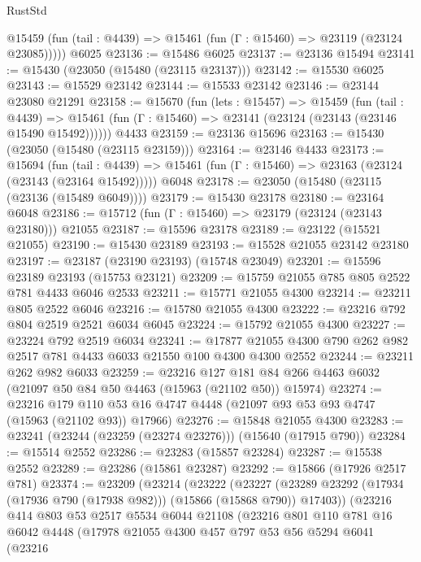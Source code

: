 \begin{lexlean}{RustStd}
\begin{coremodule}
{\begin{coremodule}
{{{{{{{{{{{{{{{{{{{{{{{{{{{{{{{{{{{{{{{{{{{{{{{{{{{{{{{{{{{{      @15459 (fun (tail : @4439) => @15461 (fun (Γ : @15460) => @23119 (@23124 @23085)))))
    @6025
@23136 := @15486 @6025
@23137 := @23136 @15494
@23141 := @15430 (@23050 (@15480 (@23115 @23137)))
@23142 := @15530 @6025
@23143 := @15529 @23142
@23144 := @15533 @23142
@23146 := @23144 @23080 @21291
@23158 := @15670
    (fun (lets : @15457) =>
    @15459
      (fun (tail : @4439) =>
      @15461 (fun (Γ : @15460) => @23141 (@23124 (@23143 (@23146 @15490 @15492))))))
    @4433
@23159 := @23136 @15696
@23163 := @15430 (@23050 (@15480 (@23115 @23159)))
@23164 := @23146 @4433
@23173 := @15694
    (fun (tail : @4439) => @15461 (fun (Γ : @15460) => @23163 (@23124 (@23143 (@23164 @15492)))))
    @6048
@23178 := @23050 (@15480 (@23115 (@23136 (@15489 @6049))))
@23179 := @15430 @23178
@23180 := @23164 @6048
@23186 := @15712 (fun (Γ : @15460) => @23179 (@23124 (@23143 @23180))) @21055
@23187 := @15596 @23178
@23189 := @23122 (@15521 @21055)
@23190 := @15430 @23189
@23193 := @15528 @21055 @23142 @23180
@23197 := @23187 (@23190 @23193) (@15748 @23049)
@23201 := @15596 @23189 @23193 (@15753 @23121)
@23209 := @15759 @21055 @785 @805 @2522 @781 @4433 @6046 @2533
@23211 := @15771 @21055 @4300
@23214 := @23211 @805 @2522 @6046
@23216 := @15780 @21055 @4300
@23222 := @23216 @792 @804 @2519 @2521 @6034 @6045
@23224 := @15792 @21055 @4300
@23227 := @23224 @792 @2519 @6034
@23241 := @17877 @21055 @4300 @790 @262 @982 @2517 @781 @4433 @6033 @21550 @100 @4300 @4300 @2552
@23244 := @23211 @262 @982 @6033
@23259 := @23216
    @127
    @181
    @84
    @266
    @4463
    @6032
    (@21097 @50 @84 @50 @4463 (@15963 (@21102 @50)) @15974)
@23274 := @23216
    @179
    @110
    @53
    @16
    @4747
    @4448
    (@21097 @93 @53 @93 @4747 (@15963 (@21102 @93)) @17966)
@23276 := @15848 @21055 @4300
@23283 := @23241 (@23244 (@23259 (@23274 @23276))) (@15640 (@17915 @790))
@23284 := @15514 @2552
@23286 := @23283 (@15857 @23284)
@23287 := @15538 @2552
@23289 := @23286 (@15861 @23287)
@23292 := @15866 (@17926 @2517 @781)
@23374 := @23209
    (@23214
      (@23222
        (@23227 (@23289 @23292 (@17934 (@17936 @790 (@17938 @982))) (@15866 (@15868 @790)) @17403))
        (@23216
          @414
          @803
          @53
          @2517
          @5534
          @6044
          @21108
          (@23216
            @801
            @110
            @781
            @16
            @6042
            @4448
            (@17978
              @21055
              @4300
              @457
              @797
              @53
              @56
              @5294
              @6041
              (@23216
}}}}}}}}}}}}}}}}}}}}}}}}}}}}}}}}}}}}}}}}}}}}}}}}}}}}}}}}}}}}
\end{coremodule}}
\end{coremodule}
\end{lexlean}
